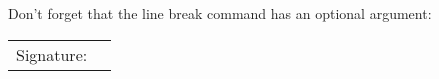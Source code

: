 \documentclass[12pt]{article}
\begin{document}
\doublespacing

Don't forget that the line break command has an optional argument: \\[5pt]
\begin{tabular}{@{}p{2in}p{3in}@{}}
  Signature: & \hrulefill
\end{tabular}
\end{document}
